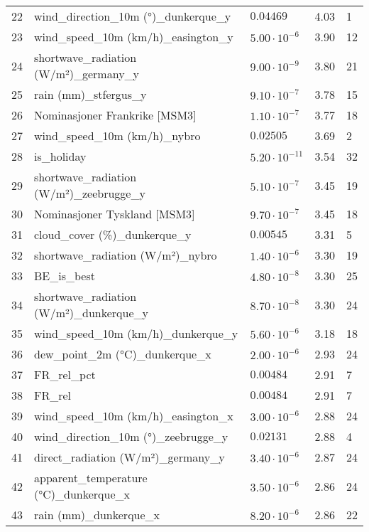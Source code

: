 \begin{table}[H]
\begin{tabular}{r l l l l}
        22 & wind\_direction\_10m (°)\_dunkerque\_y & $0.04469$ & 4.03 & 1 \\
        23 & wind\_speed\_10m (km/h)\_easington\_y & $5.00 \cdot 10^{-6}$ & 3.90 & 12 \\
        24 & shortwave\_radiation (W/m²)\_germany\_y & $9.00 \cdot 10^{-9}$ & 3.80 & 21 \\
        25 & rain (mm)\_stfergus\_y & $9.10 \cdot 10^{-7}$ & 3.78 & 15 \\
        26 & Nominasjoner Frankrike [MSM3] & $1.10 \cdot 10^{-7}$ & 3.77 & 18 \\
        27 & wind\_speed\_10m (km/h)\_nybro & $0.02505$ & 3.69 & 2 \\
        28 & is\_holiday & $5.20 \cdot 10^{-11}$ & 3.54 & 32 \\
        29 & shortwave\_radiation (W/m²)\_zeebrugge\_y & $5.10 \cdot 10^{-7}$ & 3.45 & 19 \\
        30 & Nominasjoner Tyskland [MSM3] & $9.70 \cdot 10^{-7}$ & 3.45 & 18 \\
        31 & cloud\_cover (\%)\_dunkerque\_y & $0.00545$ & 3.31 & 5 \\
        32 & shortwave\_radiation (W/m²)\_nybro & $1.40 \cdot 10^{-6}$ & 3.30 & 19 \\
        33 & BE\_is\_best & $4.80 \cdot 10^{-8}$ & 3.30 & 25 \\
        34 & shortwave\_radiation (W/m²)\_dunkerque\_y & $8.70 \cdot 10^{-8}$ & 3.30 & 24 \\
        35 & wind\_speed\_10m (km/h)\_dunkerque\_y & $5.60 \cdot 10^{-6}$ & 3.18 & 18 \\
        36 & dew\_point\_2m (°C)\_dunkerque\_x & $2.00 \cdot 10^{-6}$ & 2.93 & 24 \\
        37 & FR\_rel\_pct & $0.00484$ & 2.91 & 7 \\
        38 & FR\_rel & $0.00484$ & 2.91 & 7 \\
        39 & wind\_speed\_10m (km/h)\_easington\_x & $3.00 \cdot 10^{-6}$ & 2.88 & 24 \\
        40 & wind\_direction\_10m (°)\_zeebrugge\_y & $0.02131$ & 2.88 & 4 \\
        41 & direct\_radiation (W/m²)\_germany\_y & $3.40 \cdot 10^{-6}$ & 2.87 & 24 \\
        42 & apparent\_temperature (°C)\_dunkerque\_x & $3.50 \cdot 10^{-6}$ & 2.86 & 24 \\
        43 & rain (mm)\_dunkerque\_x & $8.20 \cdot 10^{-6}$ & 2.86 & 22 \\

\end{tabular}
\end{table}
